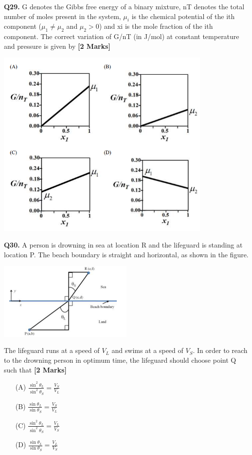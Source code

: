 \documentclass[11pt]{article}
\newcommand{\questionb}[2]{
    \noindent\textbf{Q#2.} #1 \hfill \textbf{[2 Marks]}
}
\begin{document}
\questionb{G denotes the Gibbs free energy of a binary mixture, nT denotes the total number of moles present in the system, \(\mu_i\) is the chemical potential of the ith component (\(\mu_1 \neq \mu_2\) and \(\mu_2 > 0\)) and xi is the mole fraction of the ith component. The correct variation of G/nT (in J/mol) at constant temperature and pressure is given by}{29}
\begin{center}
\includegraphics[width=0.8\textwidth]{figures/Q29.png}
\end{center}

\questionb{A person is drowning in sea at location R and the lifeguard is standing at location P. The beach boundary is straight and horizontal, as shown in the figure.
\begin{center}
\includegraphics[width=0.5\textwidth]{figures/Q30.png}
\end{center}
The lifeguard runs at a speed of \(V_L\) and swims at a speed of \(V_S\). In order to reach to the drowning person in optimum time, the lifeguard should choose point Q such that}{30}

\begin{enumerate}
    \item[(A)] \(\frac{\sin^2 \theta_L}{\sin^2 \theta_S} = \frac{V_S}{V_L}\)  
    \item[(B)] \(\frac{\sin \theta_L}{\sin \theta_S} = \frac{V_S}{V_L}\)  
    \item[(C)] \(\frac{\sin^2 \theta_L}{\sin^2 \theta_S} = \frac{V_L}{V_S}\)  
    \item[(D)] \(\frac{\sin \theta_L}{\sin \theta_S} = \frac{V_L}{V_S}\)  
\end{enumerate}
\end{document}
